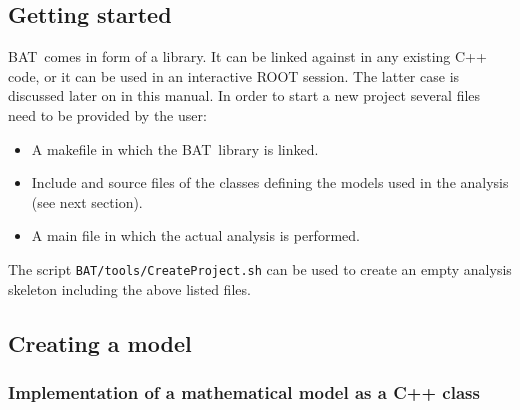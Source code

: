 \documentclass[11pt, a4paper]{article}
\newcommand{\BAT}{{\sc BAT}}
\begin{document}

\subsection{Getting started} 
\label{subsection:start}

\BAT\ comes in form of a library. It can be linked against
in any existing C++ code, or it can be used in an interactive ROOT
session. The latter case is discussed later on in this manual. In
order to start a new project several files need to be provided by the
user:
% 
\begin{itemize}
\item A makefile in which the \BAT\ library is linked. 
\item Include and source files of the classes defining the models
used in the analysis (see next section). 
\item A main file in which the actual analysis is performed. 
\end{itemize} 

\noindent  
The script \verb|BAT/tools/CreateProject.sh| can be used to create an
empty analysis skeleton including the above listed files.


\subsection{Creating a model} 
\label{subsection:model}


\subsubsection{Implementation of a mathematical model as a C++ class} 
\label{subsubsection:implementation}
\end{document}
